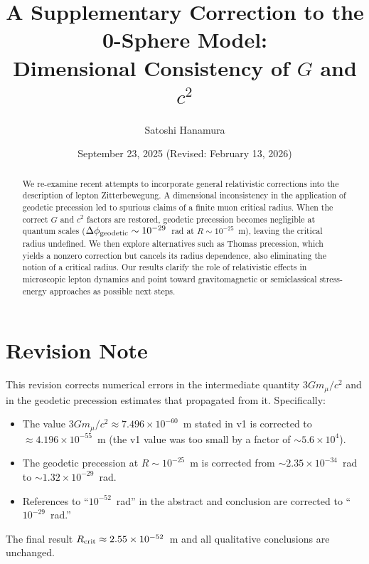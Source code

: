 \documentclass[%
 reprint,
 amsmath,amssymb,
 aps,
]{revtex4-1}
\numberwithin{equation}{section}
\begin{document}

\title{A Supplementary Correction to the 0-Sphere Model:\\ Dimensional Consistency of $G$ and $c^2$}
\author{Satoshi Hanamura}
\date{September 23, 2025 (Revised: February 13, 2026)}

\begin{abstract}
We re-examine recent attempts to incorporate general relativistic corrections into the description of lepton Zitterbewegung. 
A dimensional inconsistency in the application of geodetic precession led to spurious claims of a finite muon critical radius. 
When the correct $G$ and $c^2$ factors are restored, geodetic precession becomes negligible at quantum scales ($\Delta\phi_{\rm geodetic} \sim 10^{-29}$~rad at $R \sim 10^{-25}$~m), 
leaving the critical radius undefined. We then explore alternatives such as Thomas precession, which yields a nonzero correction 
but cancels its radius dependence, also eliminating the notion of a critical radius. 
Our results clarify the role of relativistic effects in microscopic lepton dynamics and point toward gravitomagnetic 
or semiclassical stress-energy approaches as possible next steps. 
\end{abstract}

\maketitle

\section*{Revision Note}

This revision corrects numerical errors in the intermediate quantity $3Gm_\mu/c^2$ and in the geodetic precession estimates that propagated from it. Specifically:
\begin{itemize}
\item The value $3Gm_\mu/c^2 \approx 7.496 \times 10^{-60}$~m stated in v1 is corrected to $\approx 4.196 \times 10^{-55}$~m (the v1 value was too small by a factor of $\sim 5.6 \times 10^4$).
\item The geodetic precession at $R \sim 10^{-25}$~m is corrected from $\sim 2.35 \times 10^{-34}$~rad to $\sim 1.32 \times 10^{-29}$~rad.
\item References to ``$10^{-52}$~rad'' in the abstract and conclusion are corrected to ``$10^{-29}$~rad.''
\end{itemize}
The final result $R_{\rm crit} \approx 2.55 \times 10^{-52}$~m and all qualitative conclusions are unchanged.
\end{document}
